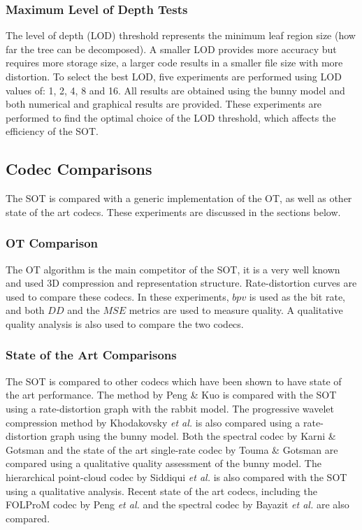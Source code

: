 \subsubsection{Maximum Level of Depth Tests}

The level of depth (LOD) threshold represents the minimum leaf region size (how far the tree can be decomposed). A smaller LOD provides more accuracy but requires more storage size, a larger code results in a smaller file size with more distortion. To select the best LOD, five experiments are performed using LOD values of: 1, 2, 4, 8 and 16. All results are obtained using the bunny model and both numerical and graphical results are provided. These experiments are performed to find the optimal choice of the LOD threshold, which affects the efficiency of the SOT. 

\subsection{Codec Comparisons}

The SOT is compared with a generic implementation of the OT, as well as other state of the art codecs. These experiments are discussed in the sections below.


\subsubsection{OT Comparison}

The OT algorithm is the main competitor of the SOT, it is a very well known and used 3D compression and representation structure. Rate-distortion curves are used to compare these codecs. In these experiments, $bpv$ is used as the bit rate, and both $DD$ and the $MSE$ metrics are used to measure quality. A qualitative quality analysis is also used to compare the two codecs. 

\subsubsection{State of the Art Comparisons}

The SOT is compared to other codecs which have been shown to have state of the art performance. The method by Peng \& Kuo \cite{Peng05Geometry-Guided} is compared with the SOT using a rate-distortion graph with the rabbit model. The progressive wavelet compression method by Khodakovsky \textit{et al.} \cite{Khodakovsky00Progressive} is also compared using a rate-distortion graph using the bunny model. Both the spectral codec by Karni \& Gotsman \cite{Karni00Spectral} and the state of the art single-rate codec by Touma \& Gotsman \cite{touma98triangle} are compared using a qualitative quality assessment of the bunny model. The hierarchical point-cloud codec by Siddiqui \textit{et al.} \cite{Siddiqui07Octree} is also compared with the SOT using a qualitative analysis. Recent state of the art codecs, including the FOLProM codec by Peng \textit{et al.} \cite{Peng10Feature} and the spectral codec by Bayazit \textit{et al.} \cite{Bayazit103DMesh} are also compared.
